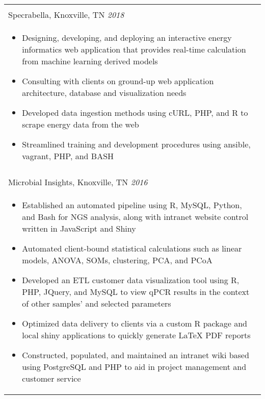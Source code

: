 \documentclass[10pt]{article}%
\begin{document}
   \newpage
   \begin{tabularx}{\linewidth}{M}%
          \\
         Specrabella, Knoxville, TN \textit{2018  } \\
      \begin{itemize}[topsep=-12pt,parsep=0em]
         \setlength\itemsep{0em}
         \item Designing, developing, and deploying an interactive energy informatics web application that provides real-time calculation from machine learning derived models %
         \item Consulting with clients on ground-up web application architecture, database and visualization needs%
          \item Developed data ingestion methods using cURL, PHP, and R to scrape energy data from the web %
          \item Streamlined training and development procedures using ansible, vagrant, PHP, and BASH %
      \end{itemize} \\
       \\
      Microbial Insights, Knoxville, TN \textit{2016 } \\
      \begin{itemize}[topsep=-12pt,parsep=0em]
         \setlength\itemsep{0em}
         \item Established an automated pipeline using R, MySQL, Python, and Bash for NGS analysis, along with intranet website control written in JavaScript and Shiny  %
         \item Automated client-bound statistical calculations such as linear models, ANOVA, SOMs, clustering, PCA, and PCoA %
         \item Developed an ETL customer data visualization tool using R, PHP, JQuery, and MySQL to view qPCR results in the context of other samples' and selected parameters %
         \item Optimized data delivery to clients via a custom R package and local shiny applications to quickly generate \LaTeX{} PDF reports  %
         \item Constructed, populated, and maintained an intranet wiki based using PostgreSQL and PHP to aid in project management and customer service
        \end{itemize} \\

\end{tabularx}
\end{document}
